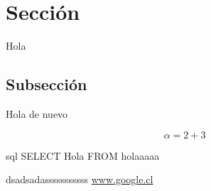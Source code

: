 
\section{Sección}

Hola

\subsection{Subsección}

Hola de nuevo

\begin{equation}
    \alpha = 2 + 3
\end{equation}

\begin{mintedcode}{sql}
    SELECT Hola
    FROM holaaaaa
\end{mintedcode}




dsadsadasssssssssss \url{www.google.cl}